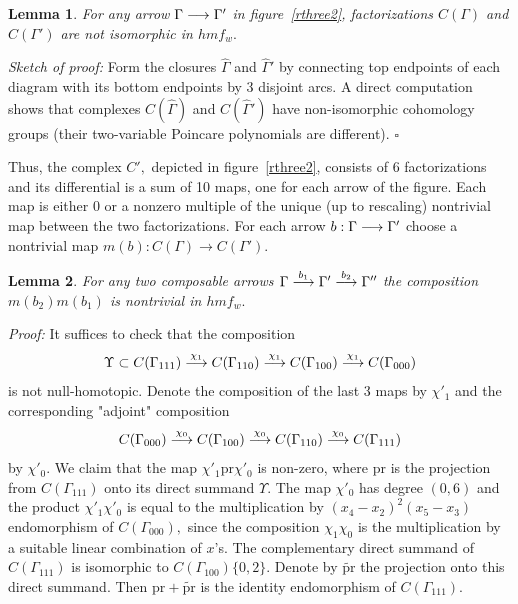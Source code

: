 \documentclass[12pt]{article}
\newtheorem{lemma}{Lemma}
\begin{document}
\vspace{0.1in} 

\begin{lemma} \label{not-iso} For any arrow $\Gamma\longrightarrow \Gamma'$ 
in figure~\ref{rthree2}, factorizations $C(\Gamma)$ and $C(\Gamma')$ 
are not isomorphic in $hmf_w.$ \end{lemma} 

\emph{Sketch of proof:} Form the closures $\widehat{\Gamma}$ and $\widehat{\Gamma}'$ 
by connecting top endpoints of each diagram with its bottom endpoints 
by 3 disjoint arcs. A direct computation shows that complexes 
$C(\widehat{\Gamma})$ and $C(\widehat{\Gamma}')$ have non-isomorphic 
cohomology groups (their two-variable Poincare polynomials are different). 
$\square$ 

\vspace{0.1in} 

Thus, the complex $C',$ depicted in figure~\ref{rthree2},
consists of 6 factorizations and its differential is a sum of 
10 maps, one for each arrow of the figure. Each map is either 0 
or a nonzero multiple of the unique (up to rescaling) nontrivial 
map between the two factorizations. For each arrow $b: \Gamma\longrightarrow \Gamma'$ 
choose a nontrivial map $m(b): C(\Gamma) \to C(\Gamma').$ 

\begin{lemma} \label{2-nontriv} 
For any two composable arrows $\Gamma\stackrel{b_1}{\longrightarrow} \Gamma'
\stackrel{b_2}{\longrightarrow}\Gamma''$ the composition $m(b_2)m(b_1)$ is nontrivial 
in $hmf_w.$ 
\end{lemma}

\emph{Proof:} It suffices to check that the composition 
\begin{equation} \label{eq-4-maps} 
\Upsilon \subset C(\Gamma_{111}) \stackrel{\chi_1}{\longrightarrow} C(\Gamma_{110}) 
\stackrel{\chi_1}{\longrightarrow} C(\Gamma_{100}) \stackrel{\chi_1}{\longrightarrow} C(\Gamma_{000})
\end{equation} 
is not null-homotopic. Denote the composition of the last 3 maps by $\chi'_1$ and 
the corresponding "adjoint" composition 
$$ C(\Gamma_{000})\stackrel{\chi_0}{\longrightarrow}C(\Gamma_{100})
\stackrel{\chi_0}{\longrightarrow}C(\Gamma_{110}) 
\stackrel{\chi_0}{\longrightarrow}C(\Gamma_{111})$$
by $\chi'_0.$ We claim that the map $\chi'_1\mathrm{pr} \chi'_0$ is non-zero, 
where $\mathrm{pr}$ is the projection from $C(\Gamma_{111})$ onto 
its direct summand $\Upsilon.$ The map $\chi'_0$ has degree $(0,6)$
and the product $\chi'_1\chi'_0$ is equal to the multiplication by 
$(x_4-x_2)^2(x_5-x_3)$ endomorphism of $C(\Gamma_{000}),$ since 
the composition $\chi_1\chi_0$ is the multiplication by a suitable linear 
combination of $x$'s. The complementary direct summand of 
$C(\Gamma_{111})$ is isomorphic to $C(\Gamma_{100})\{0,2\}.$ 
Denote by $\widetilde{\mathrm{pr}}$ the projection onto this direct summand. Then 
$\mathrm{pr} + \widetilde{\mathrm{pr}}$ is the identity endomorphism of 
$C(\Gamma_{111}).$ 
\end{document}
